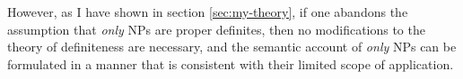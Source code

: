 However, as I have shown in section \ref{sec:my-theory}, if one abandons the assumption that \textit{only} NPs are proper definites, then no modifications to the theory of definiteness are necessary, and the semantic account of \textit{only} NPs can be formulated in a manner that is consistent with their limited scope of application.